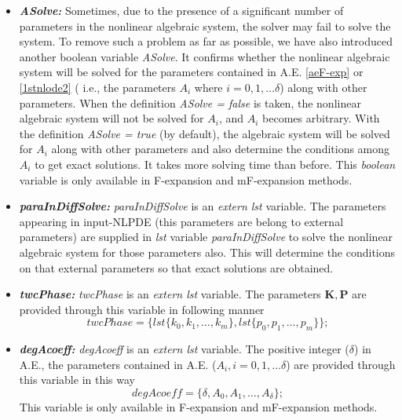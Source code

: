 \documentclass[prd,aps,floats,showkeys,nofootinbib,notitlepage]{revtex4}
\begin{document}
\begin{itemize}
		\item[] {\em \textbf{ASolve:}} Sometimes, due to the presence of a significant number of parameters in the nonlinear algebraic system, the solver may fail to solve the system. To remove such a problem as far as possible, we have also introduced another boolean variable {\em ASolve}. It confirms whether the nonlinear algebraic system will be solved for the parameters contained in A.E. \eqref{aeF-exp} or \eqref{1stnlode2} ( i.e., the parameters $A_i$ where $i=0,1,\ldots \delta$) along with other parameters. When the definition {\em ASolve = false} is taken, the nonlinear algebraic system will not be solved for $A_i$, and $A_i$ becomes arbitrary. With the definition {\em ASolve = true} (by default), the algebraic system will be solved for $A_i$ along with other parameters and also determine the conditions among $A_i$ to get exact solutions. It takes more solving time than before. This {\em boolean} variable is only available in F-expansion and mF-expansion methods. 
		
		\item[] {\em \textbf{paraInDiffSolve:}} {\em paraInDiffSolve} is an {\em extern lst} variable. The parameters appearing in input-NLPDE (this parameters are belong to external parameters) are supplied in {\em lst} variable {\em paraInDiffSolve} to solve the nonlinear algebraic system for those parameters also. This will determine the conditions on that external parameters so that exact solutions are obtained.
		
		\item[] {\em \textbf{twcPhase:}} {\em twcPhase} is an {\em extern lst} variable. The parameters $\boldsymbol{K}, \boldsymbol{P}$ are provided through this variable in following manner
		\begin{equation}
			twcPhase = \{lst\{k_0,k_1,\ldots,k_m\},lst\{p_0,p_1,\ldots,p_m\}\};
		\end{equation}
		\item[] {\em \textbf{degAcoeff:}} {\em degAcoeff} is an {\em extern lst} variable. The positive integer ($\delta$) in A.E., the parameters contained in A.E. ($A_i,i=0,1,\ldots\delta$) are provided through this variable in this way
		\begin{equation}
			degAcoeff=\{\delta,A_0,A_1,\ldots,A_\delta\};
		\end{equation}
		This variable is only available in F-expansion and mF-expansion methods.
		

\end{itemize}
\end{document}

